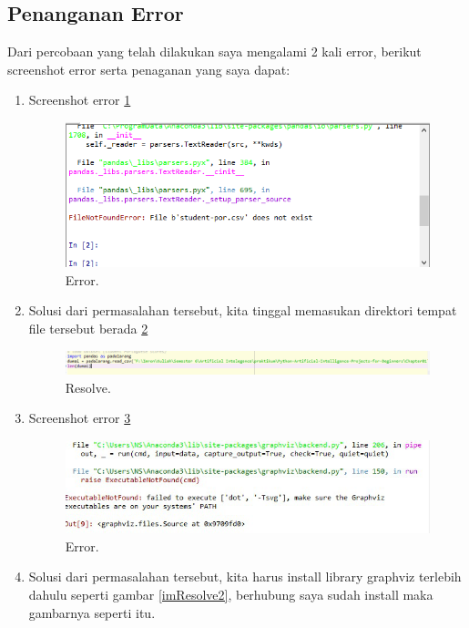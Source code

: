 \subsection{Penanganan Error}
Dari percobaan yang telah dilakukan saya mengalami 2 kali error, berikut screenshot error serta penaganan yang saya dapat:
\begin{enumerate}
\item Screenshot error \ref{Error1}
		\begin{figure}[ht]
		\centerline{\includegraphics[width=1\textwidth]{figures/im/imError1.png}}
		\caption{Error.}
		\label{Error1}
		\end{figure}
\item Solusi dari permasalahan tersebut, kita tinggal memasukan direktori tempat file tersebut berada \ref{imResolve1}
		\begin{figure}[ht]
		\centerline{\includegraphics[width=1\textwidth]{figures/im/imResolve1.png}}
		\caption{Resolve.}
		\label{imResolve1}
		\end{figure}
\item Screenshot error \ref{Error2}
		\begin{figure}[ht]
		\centerline{\includegraphics[width=1\textwidth]{figures/im/imErrror2.png}}
		\caption{Error.}
		\label{Error2}
		\end{figure}
\item Solusi dari permasalahan tersebut, kita harus install library graphviz terlebih dahulu seperti gambar \ref{imResolve2}, berhubung saya sudah install maka gambarnya seperti itu. 

\end{enumerate}
